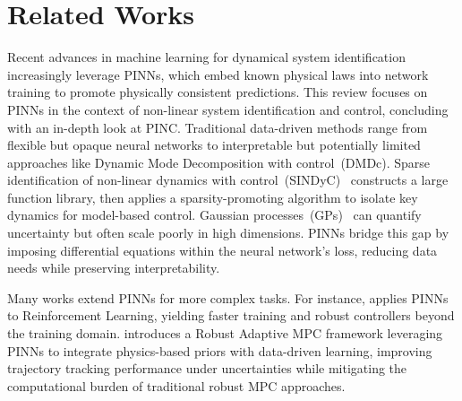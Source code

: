 \section{Related Works} %
\label{sec:related}
Recent advances in machine learning for dynamical system identification increasingly leverage PINNs, which embed known physical laws into network training to promote physically consistent predictions. This review focuses on PINNs in the context of non-linear system identification and control, concluding with an in-depth look at PINC. Traditional data-driven methods range from flexible but opaque neural networks to interpretable but potentially limited approaches like Dynamic Mode Decomposition with control~(DMDc). Sparse identification of non-linear dynamics with control~(SINDyC)~\cite{brunton_data-driven_2021} constructs a large function library, then applies a sparsity-promoting algorithm to isolate key dynamics for model-based control. Gaussian processes~(GPs)~\cite{rasmussen_gaussian_2008,amer2025} can quantify uncertainty but often scale poorly in high dimensions. PINNs bridge this gap by imposing differential equations within the neural network’s loss, reducing data needs while preserving interpretability.

Many works extend PINNs for more complex tasks. For instance, \cite{faria_data-driven_2024} applies PINNs to Reinforcement Learning, yielding faster training and robust controllers beyond the training domain. \cite{ramp} introduces a Robust Adaptive MPC framework leveraging PINNs to integrate physics-based priors with data-driven learning, improving trajectory tracking performance under uncertainties while mitigating the computational burden of traditional robust MPC approaches.

